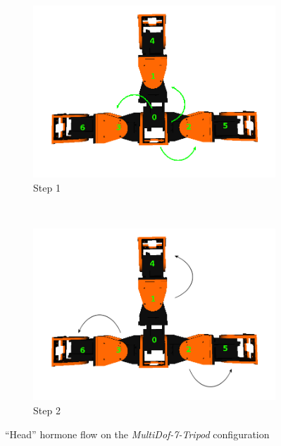 \begin{figure}[h]
		\centering
        \begin{subfigure}[l]{0.45\textwidth}
                \centering
                \includegraphics[width=\textwidth]{images/Hormone_protocol_tripod_head_step1.png}
                \caption{Step 1}
                \label{fig:tripod_step1_head}
        \end{subfigure}
        ~
        \begin{subfigure}[r]{0.45\textwidth}
                \centering
                \includegraphics[width=\textwidth]{images/Hormone_protocol_tripod_head_step2.png}
                \caption{Step 2}
                \label{fig:tripod_step2_head}
        \end{subfigure}
        \caption{``Head'' hormone flow on the \emph{MultiDof-7-Tripod} configuration}\label{fig:global_conf_discovery_tripod_head}
\end{figure}

